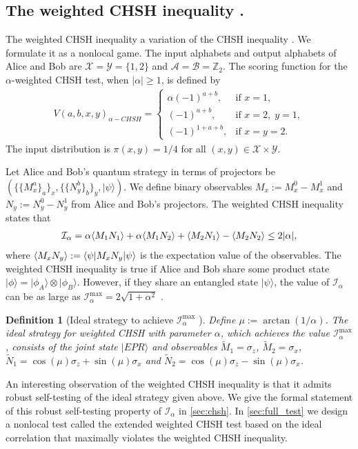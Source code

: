 \documentclass[11pt,letterpaper]{article}
\newcommand{\ket}[1]{|#1\rangle}
\newcommand{\bra}[1]{\langle#1|}
\newcommand{\x}{\otimes}
\DeclarePairedDelimiter{\ip}{\langle}{\rangle}
\newcommand{\Z}{\mathbb{Z}}
\newcommand{\calX}{\mathcal{X}}
\newcommand{\calY}{\mathcal{Y}}
\newcommand{\calA}{\mathcal{A}}
\newcommand{\calB}{\mathcal{B}}
\newcommand{\1}{\mathbb{1}}
\newcommand{\paulix}{\sigma_x}
\newcommand{\pauliz}{\sigma_z}
\newcommand{\tM}{\tilde{M}}
\newcommand{\tN}{\tilde{N}}
\newcommand{\I}{\mathcal{I}}
\newtheorem{definition}[theorem]{Definition}
\theoremstyle{definition}
\begin{document}
\subsection{The weighted CHSH inequality \cite{acin2012}.}
The weighted CHSH inequality a variation of the CHSH inequality \cite{chsh}. 
We formulate it as a nonlocal game.
The input alphabets and output alphabets of Alice and Bob are
$\calX = \calY = \{1, 2\}$ and $\calA = \calB = \Z_2$.
The scoring function for the $\alpha$-weighted CHSH test, when $|\alpha|\geq 1$, is defined by
\begin{align}
	V(a,b,x,y)_{\alpha-CHSH} = 
	\begin{cases}
		\alpha (-1)^{a + b}, & \text{if } x = 1, \\
		(-1)^{a + b},  &\text{if } x = 2,\; y = 1, \\
		(-1)^{1 + a + b},  &\text{if } x = y = 2.
	\end{cases}
\end{align}
The input distribution is $\pi(x,y) = 1/4$ for all $(x,y) \in \calX \times \calY$.

Let Alice and Bob's quantum strategy in terms of projectors be $( \{\{M_x^a\}_a\}_x, \{\{N_y^b\}_b\}_y, \ket{\psi})$. 
We define binary observables $M_x := M_x^0 - M_x^1$ and $N_y := N_y^0 - N_y^1$ from Alice and Bob's projectors.
The weighted CHSH inequality states that 
\begin{align}
	\label{eq:chsh_op}
	\I_\alpha = \alpha\ip{M_1N_1}+\alpha\ip{M_1N_2} + \ip{M_2N_1} - \ip{M_2N_2}\leq 2|\alpha|,
\end{align}
where $\ip{M_x N_y} := \bra{\psi} M_x N_y \ket{\psi}$ is the expectation value of the observables. 
The weighted CHSH inequality is true 
if Alice and Bob share some product state $\ket{\phi} = \ket{\phi_A} \x \ket{\phi_B}$.
However, if they share an entangled state $\ket{\psi}$, the value of $\I_\alpha$ can be as large as
$ \I_\alpha^{\max} = 2\sqrt{1+\alpha^2}$ \cite{acin2012}.
\begin{definition}[Ideal strategy to achieve $\I_\alpha^{\max}$ \cite{acin2012}]
	\label{def:ideal}
	Define $\mu := \arctan(1/\alpha)$.
	The ideal strategy for weighted CHSH with parameter $\alpha$, which achieves the value $\I_\alpha^{\max}$, 
	consists of the joint state $\ket{EPR}$ and observables $\tM_1 = \pauliz$, $\tM_2 = \paulix$,
	$\tN_1 = \cos(\mu) \pauliz+ \sin(\mu) \paulix$ and $\tN_2 = \cos(\mu) \pauliz - \sin(\mu) \paulix$.
\end{definition}
An interesting observation of the weighted CHSH inequality is that it admits robust self-testing of the ideal strategy given
above. 
We give the formal statement of this robust self-testing property of $\I_\alpha$ in \cref{sec:chsh}.
In \cref{sec:full_test} we design
a nonlocal test called the extended weighted CHSH test based on 
the ideal correlation that maximally violates the weighted CHSH inequality.
\end{document}
